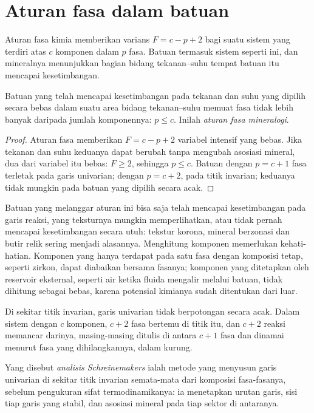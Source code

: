\section{Aturan fasa dalam batuan}\label{sec:b3:petrological-thermodynamics:phase-rule}

Aturan fasa kimia memberikan varians $F = c - p + 2$ bagi suatu sistem yang
terdiri atas $c$ komponen dalam $p$ fasa. Batuan termasuk sistem seperti ini, dan mineralnya
menunjukkan bagian bidang tekanan--suhu tempat batuan itu mencapai kesetimbangan.

\begin{proposition}\label{prop:b3:petrological-thermodynamics:goldschmidt}
Batuan yang telah mencapai kesetimbangan pada tekanan dan suhu yang dipilih
secara bebas dalam suatu area bidang tekanan--suhu memuat fasa tidak lebih banyak
daripada jumlah komponennya: $p \le c$. Inilah
\emph{aturan fasa mineralogi}.
\end{proposition}

\begin{proof}
Aturan fasa memberikan $F = c - p + 2$ variabel intensif yang bebas. Jika
tekanan dan suhu keduanya dapat berubah tanpa mengubah asosiasi mineral, dua dari
variabel itu bebas: $F \ge 2$, sehingga $p \le c$. Batuan dengan $p = c + 1$ fasa
terletak pada garis univarian; dengan $p = c + 2$, pada titik invarian; keduanya
tidak mungkin pada batuan yang dipilih secara acak.
\end{proof}

Batuan yang melanggar aturan ini bisa saja telah mencapai kesetimbangan pada garis reaksi, yang
teksturnya mungkin memperlihatkan, atau tidak pernah mencapai kesetimbangan secara utuh: tekstur korona,
mineral berzonasi dan butir relik sering menjadi alasannya. Menghitung komponen
memerlukan kehati-hatian. Komponen yang hanya terdapat pada satu fasa dengan komposisi tetap, seperti
zirkon, dapat diabaikan bersama fasanya; komponen yang ditetapkan oleh reservoir eksternal,
seperti air ketika fluida mengalir melalui batuan, tidak dihitung
sebagai bebas, karena potensial kimianya sudah ditentukan dari luar.

Di sekitar titik invarian, garis univarian tidak berpotongan secara acak. Dalam
sistem dengan $c$ komponen, $c + 2$ fasa bertemu di titik itu, dan $c + 2$
reaksi memancar darinya, masing-masing ditulis di antara $c + 1$ fasa dan dinamai
menurut fasa yang dihilangkannya, dalam kurung.

\begin{definition}\label{def:b3:petrological-thermodynamics:schreinemakers}
Yang disebut \emph{analisis Schreinemakers} ialah metode
yang menyusun garis univarian di sekitar titik invarian semata-mata dari
komposisi fasa-fasanya, sebelum pengukuran sifat termodinamikanya: ia menetapkan
urutan garis, sisi tiap garis yang stabil,
dan asosiasi mineral pada tiap sektor di antaranya.
\end{definition}

